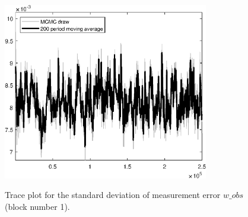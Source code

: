 \begin{figure}[H]
\centering
  \includegraphics[width=0.8\textwidth]{BRS_sectoral_rest/graphs/TracePlot_SE_EOBS_w_obs_blck_1}\\
    \caption{Trace plot for the standard deviation of measurement error $w\_obs$ (block number 1).}
\end{figure}
